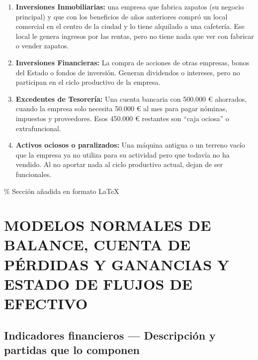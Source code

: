 \documentclass[12pt]{book} %
\providecommand{\tightlist}{%
  \setlength{\itemsep}{0pt}\setlength{\parskip}{0pt}}
\begin{document}
\begin{enumerate}
\def\labelenumi{\arabic{enumi}.}
\tightlist
\item
  \textbf{Inversiones Inmobiliarias:} una empresa que fabrica zapatos
  (su negocio principal) y que con los beneficios de años anteriores
  compró un local comercial en el centro de la ciudad y lo tiene
  alquilado a una cafetería. Ese local le genera ingresos por las
  rentas, pero no tiene nada que ver con fabricar o vender zapatos.
\item
  \textbf{Inversiones Financieras:} La compra de acciones de otras
  empresas, bonos del Estado o fondos de inversión. Generan dividendos o
  intereses, pero no participan en el ciclo productivo de la empresa.
\item
  \textbf{Excedentes de Tesorería:} Una cuenta bancaria con 500.000 €
  ahorrados, cuando la empresa solo necesita 50.000 € al mes para pagar
  nóminas, impuestos y proveedores. Esos 450.000 € restantes son ``caja
  ociosa'' o extrafuncional.
\item
  \textbf{Activos ociosos o paralizados:} Una máquina antigua o un
  terreno vacío que la empresa ya no utiliza para su actividad pero que
  todavía no ha vendido. Al no aportar nada al ciclo productivo actual,
  dejan de ser funcionales.
\end{enumerate}

\% Sección añadida en formato LaTeX

\section*{MODELOS NORMALES DE BALANCE, CUENTA DE PÉRDIDAS Y GANANCIAS Y ESTADO DE FLUJOS DE EFECTIVO}

\subsection*{Indicadores financieros — Descripción y partidas que lo componen}
\end{document}
